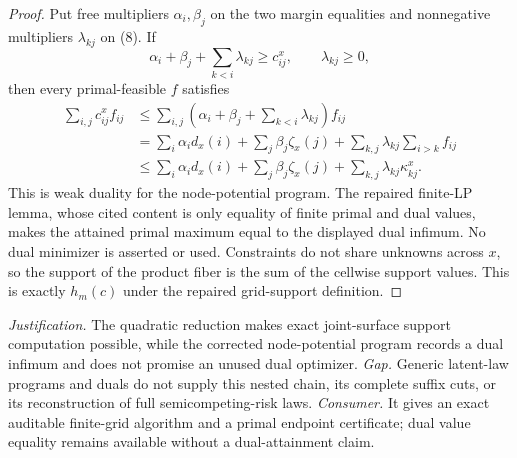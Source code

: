 \documentclass{article}
\begin{document}
\begin{proof}
Put free multipliers \(\alpha_i,\beta_j\) on the two margin equalities and nonnegative multipliers \(\lambda_{kj}\) on (8).  If
\[
\alpha_i+\beta_j+\sum_{k<i}\lambda_{kj}\geq c^x_{ij},
\qquad \lambda_{kj}\geq0,                                          \tag{10}
\]
then every primal-feasible \(f\) satisfies
\[
\begin{aligned}
\sum_{i,j}c^x_{ij}f_{ij}
&\leq\sum_{i,j}\left(\alpha_i+\beta_j+
\sum_{k<i}\lambda_{kj}\right)f_{ij}\\
&=\sum_i\alpha_i d_x(i)+\sum_j\beta_j\zeta_x(j)
+\sum_{k,j}\lambda_{kj}\sum_{i>k}f_{ij}\\
&\leq\sum_i\alpha_i d_x(i)+\sum_j\beta_j\zeta_x(j)
+\sum_{k,j}\lambda_{kj}\kappa^x_{kj}.                              \tag{11}
\end{aligned}
\]
This is weak duality for the node-potential program.  The repaired finite-LP lemma, whose cited content is only equality of finite primal and dual values, makes the attained primal maximum equal to the displayed dual infimum.  No dual minimizer is asserted or used.  Constraints do not share unknowns across \(x\), so the support of the product fiber is the sum of the cellwise support values.  This is exactly \(h_m(c)\) under the repaired grid-support definition.
\end{proof}
\par\smallskip\noindent \textit{Justification.} The quadratic reduction makes exact joint-surface support computation possible, while the corrected node-potential program records a dual infimum and does not promise an unused dual optimizer. \textit{Gap.} Generic latent-law programs and duals do not supply this nested chain, its complete suffix cuts, or its reconstruction of full semicompeting-risk laws. \textit{Consumer.} It gives an exact auditable finite-grid algorithm and a primal endpoint certificate; dual value equality remains available without a dual-attainment claim.
\end{document}
